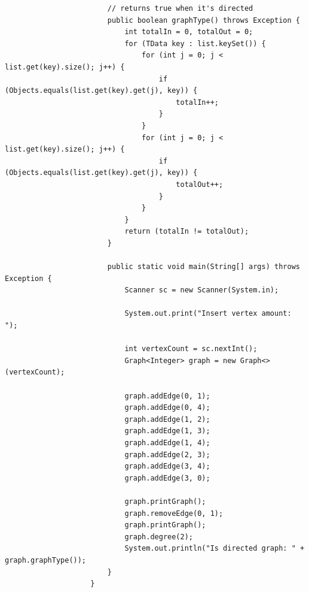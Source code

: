 \documentclass[12pt,titlepage]{article}
\begin{document}
\begin{enumerate}
{\begin{itemize}
{\begin{verbatim}
                        // returns true when it's directed
                        public boolean graphType() throws Exception {
                            int totalIn = 0, totalOut = 0;
                            for (TData key : list.keySet()) {
                                for (int j = 0; j < list.get(key).size(); j++) {
                                    if (Objects.equals(list.get(key).get(j), key)) {
                                        totalIn++;
                                    }
                                }
                                for (int j = 0; j < list.get(key).size(); j++) {
                                    if (Objects.equals(list.get(key).get(j), key)) {
                                        totalOut++;
                                    }
                                }
                            }
                            return (totalIn != totalOut);
                        }

                        public static void main(String[] args) throws Exception {
                            Scanner sc = new Scanner(System.in);

                            System.out.print("Insert vertex amount: ");

                            int vertexCount = sc.nextInt();
                            Graph<Integer> graph = new Graph<>(vertexCount);

                            graph.addEdge(0, 1);
                            graph.addEdge(0, 4);
                            graph.addEdge(1, 2);
                            graph.addEdge(1, 3);
                            graph.addEdge(1, 4);
                            graph.addEdge(2, 3);
                            graph.addEdge(3, 4);
                            graph.addEdge(3, 0);

                            graph.printGraph();
                            graph.removeEdge(0, 1);
                            graph.printGraph();
                            graph.degree(2);
                            System.out.println("Is directed graph: " + graph.graphType());
                        }
                    }
                \end{verbatim}
            }
        \end{itemize}
    }
\end{enumerate}
\end{document}

